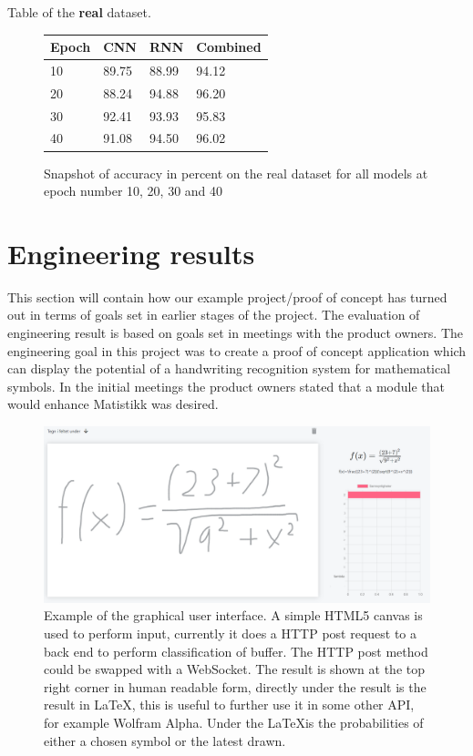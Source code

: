 Table of the \textbf{real} dataset.
\begin{figure}[H]
    \centering
    \begin{tabular}{| p{2cm} | p{3cm} | p{3cm} | p{3cm} |}
    \hline
    Epoch & \textbf{CNN} & \textbf{RNN} & \textbf{Combined} \\ \hline
    10 & 89.75 & 88.99 & 94.12 \\ \hline
    20 & 88.24 & 94.88 & 96.20 \\ \hline
    30 & 92.41 & 93.93 & 95.83 \\ \hline
    40 & 91.08 & 94.50 & 96.02 \\ \hline
    \end{tabular}
    \caption{Snapshot of accuracy in percent on the real dataset for all models at epoch number 10, 20, 30 and 40}
    \label{fig:table_real_dataset}

\end{figure}

\section{Engineering results}
This section will contain how our example project/proof of concept has turned out in terms of goals set in earlier stages of the project. The evaluation of engineering result is based on goals set in meetings with the product owners. %
%
The engineering goal in this project was to create a proof of concept application which can display the potential of a handwriting recognition system for mathematical symbols. In the initial meetings the product owners stated that a module that would enhance Matistikk was desired.


\begin{figure}[H]
    \centering
    \includegraphics[width=\textwidth]{Assets/Chapter4_Result/predictor_example.png}
    \caption{Example of the graphical user interface. A simple HTML5 canvas is used to perform input, currently it does a HTTP post request to a back end to perform classification of buffer. The HTTP post method could be swapped with a WebSocket. The result is shown at the top right corner in human readable form, directly under the result is the result in \LaTeX, this is useful to further use it in some other API, for example Wolfram Alpha. Under the \LaTeX  is the probabilities of either a chosen symbol or the latest drawn.}
    \label{fig:predictor_example}
\end{figure}

